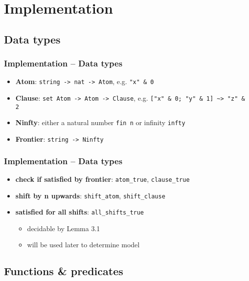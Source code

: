 \documentclass[slides]{beamer}
\begin{document}
\section{Implementation}
\subsection{Data types}

\begin{frame}[fragile]
    \frametitle{Implementation – Data types}

    \begin{itemize}
        \item
            \textbf{Atom}: \lstinline[language=Coq]{string -> nat -> Atom}, e.g. \lstinline[language=Coq]{"x" & 0}
        \item
            \textbf{Clause}: \lstinline[language=Coq]{set Atom -> Atom -> Clause}, e.g. \lstinline[language=Coq]{["x" & 0; "y" & 1] ~> "z" & 2}
        \item
            \textbf{Ninfty}: either a natural number \lstinline{fin n} or infinity \lstinline{infty}
        \item
            \textbf{Frontier}: \lstinline{string -> Ninfty}
    \end{itemize}
\end{frame}

\begin{frame}[fragile]
    \frametitle{Implementation – Data types}

    \begin{itemize}
        \item
            \textbf{check if satisfied by frontier}: \lstinline{atom_true}, \lstinline{clause_true}
        \item
            \textbf{shift by n upwards}: \lstinline{shift_atom}, \lstinline{shift_clause}
        \item
            \textbf{satisfied for all shifts}: \lstinline{all_shifts_true}
            \begin{itemize}
                \item
                    decidable by Lemma 3.1
                \item
                    will be used later to determine model
            \end{itemize}
    \end{itemize}
\end{frame}

\subsection{Functions \& predicates}
\end{document}
